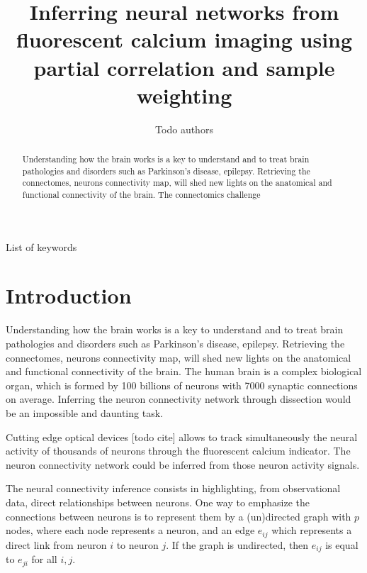 \documentclass[wcp]{jmlr}
\title[Connectomics challenge]{Inferring neural networks from fluorescent
                               calcium imaging using partial correlation and
                               sample weighting}
\author{Todo authors}
\begin{document}
\maketitle
 

\begin{abstract}
Understanding how the brain works is a key to understand and to treat
brain pathologies and disorders such as Parkinson's disease, epilepsy.
Retrieving the connectomes, neurons connectivity map, will shed new lights on
the anatomical and functional connectivity of the brain.
The connectomics challenge

\end{abstract}

\begin{keywords}
List of keywords
\end{keywords}


\section{Introduction}\label{sec:intro}

Understanding how the brain works is a key to understand and to treat
brain pathologies and disorders such as Parkinson's disease, epilepsy.
Retrieving the connectomes, neurons connectivity map, will shed new lights on
the anatomical and functional connectivity of the brain.
The human brain is a complex biological organ, which is formed by 100
billions of neurons with 7000 synaptic connections on average. Inferring the
neuron connectivity network through dissection would be an impossible
and daunting task.

Cutting edge optical devices [todo cite] allows to track simultaneously
the neural activity of thousands of neurons through the fluorescent
calcium indicator. The neuron connectivity network could be inferred
from those neuron activity signals.

The neural connectivity inference consists in highlighting, from observational data, direct relationships between neurons. One way to emphasize the connections between neurons is to represent them by a (un)directed graph with $p$ nodes, where each node represents a neuron, and an edge $e_{ij}$ which represents a direct link from neuron  $i$ to neuron $j$. If the graph is undirected, then $e_{ij}$ is equal to $e_{ji}$  for all $i,j$. 
\end{document}
